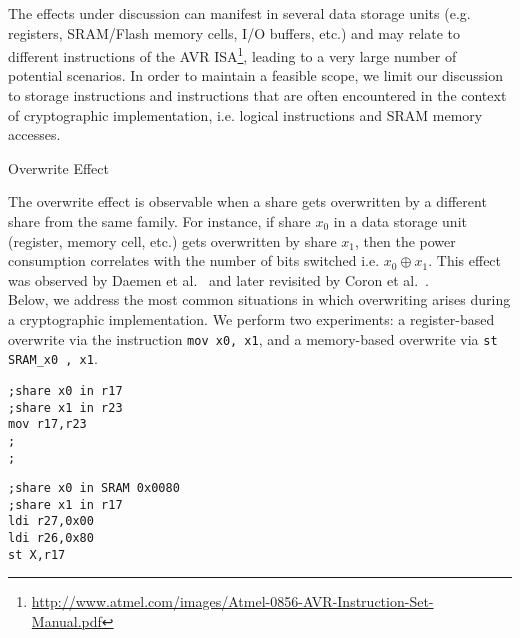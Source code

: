The effects under discussion can manifest in several data storage units (e.g. registers, SRAM/Flash memory cells, I/O buffers, etc.) and may relate to different instructions of the AVR ISA\footnote{\url{http://www.atmel.com/images/Atmel-0856-AVR-Instruction-Set-Manual.pdf}}, leading to a very large number of potential scenarios. In order to maintain a feasible scope, we limit our discussion to storage instructions and instructions that are often encountered in the context of cryptographic implementation, i.e. logical instructions and SRAM memory accesses.
\begin{subsection}{Overwrite Effect}\label{overwrite}

The overwrite effect is observable when a share gets overwritten by a different share from the same family. For instance, if share $x_0$ in a data storage unit (register, memory cell, etc.) gets overwritten by share $x_1$, then the power consumption correlates with the number of bits switched i.e. $x_0 \oplus x_1$. This effect was observed by Daemen et al.~\cite{noteonsca} and later revisited by Coron et al.~\cite{DBLP:conf/cosade/CoronGPRRV12}.\\
 Below, we address the most common situations in which overwriting arises during a cryptographic implementation. We perform two experiments: a register-based overwrite via the instruction \texttt{mov x0, x1}, and a memory-based overwrite via \texttt{st SRAM\_x0 ,  x1}. 

\noindent\begin{minipage}{.45\textwidth}
\begin{lstlisting}
;share x0 in r17
;share x1 in r23
mov r17,r23
;
;
\end{lstlisting}
\end{minipage}\hfill
\begin{minipage}{.45\textwidth}
\begin{lstlisting}
;share x0 in SRAM 0x0080
;share x1 in r17 
ldi r27,0x00
ldi r26,0x80 
st X,r17 
\end{lstlisting}
\end{minipage}


\end{subsection}
